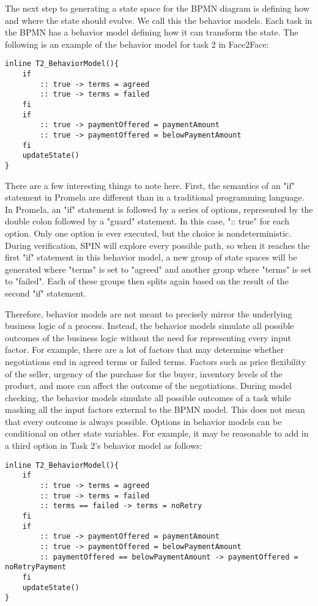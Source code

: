 The next step to generating a state space for the BPMN diagram is defining how and where the state should evolve. We call this the behavior models. Each task in the BPMN has a behavior model defining how it can transform the state. The following is an example of the behavior model for task 2 in Face2Face: 

\begin{lstlisting}[style=myPromela]
inline T2_BehaviorModel(){
    if
        :: true -> terms = agreed
        :: true -> terms = failed
    fi
    if
        :: true -> paymentOffered = paymentAmount
        :: true -> paymentOffered = belowPaymentAmount
    fi
    updateState()
}
\end{lstlisting}

There are a few interesting things to note here. First, the semantics of an "if" statement in Promela are different than in a traditional programming language. In Promela, an "if" statement is followed by a series of options, represented by the double colon followed by a "guard" statement. In this case, ":: true" for each option. Only one option is ever executed, but the choice is nondeterministic. During verification, SPIN will explore every possible path, so when it reaches the first "if" statement in this behavior model, a new group of state spaces will be generated where "terms" is set to "agreed" and another group where "terms" is set to "failed". Each of these groups then splits again based on the result of the second "if" statement.

Therefore, behavior models are not meant to precisely mirror the underlying business logic of a process. Instead, the behavior models simulate all possible outcomes of the business logic without the need for representing every input factor. For example, there are a lot of factors that may determine whether negotiations end in agreed terms or failed terms. Factors such as price flexibility of the seller, urgency of the purchase for the buyer, inventory levels of the product, and more can affect the outcome of the negotiations. During model checking, the behavior models simulate all possible outcomes of a task while masking all the input factors external to the BPMN model. This does not mean that every outcome is always possible. Options in behavior models can be conditional on other state variables. For example, it may be reasonable to add in a third option in Task 2's behavior model as follows:


\begin{lstlisting}[style=myPromela]
inline T2_BehaviorModel(){
    if
        :: true -> terms = agreed
        :: true -> terms = failed
        :: terms == failed -> terms = noRetry
    fi
    if
        :: true -> paymentOffered = paymentAmount
        :: true -> paymentOffered = belowPaymentAmount
        :: paymentOffered == belowPaymentAmount -> paymentOffered = noRetryPayment
    fi
    updateState()
}
\end{lstlisting}

